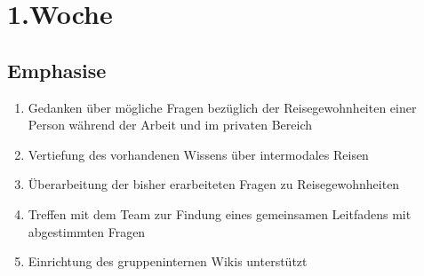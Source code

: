 \chapter{1.\hspace{0.5em}Woche}\label{wo1}

\section{Emphasise}\label{wo1_1}
  
\begin{enumerate}[label={\Roman*)}]
	\item Gedanken \"uber m\"ogliche Fragen bez\"uglich der Reisegewohnheiten einer Person w\"ahrend der Arbeit und im
privaten    Bereich
	\item Vertiefung des vorhandenen Wissens \"uber intermodales Reisen
	\item \"Uberarbeitung der bisher erarbeiteten Fragen zu Reisegewohnheiten
	\item Treffen mit dem Team zur Findung eines gemeinsamen Leitfadens mit abgestimmten Fragen
	\item Einrichtung des gruppeninternen Wikis unterst\"utzt
 \end{enumerate}